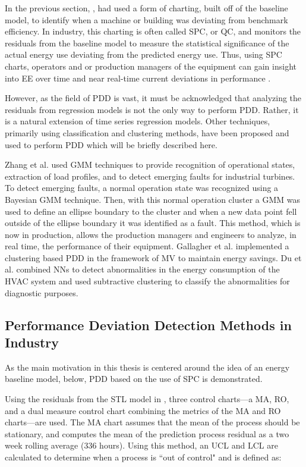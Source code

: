 In the previous section, \cite{tightening}\cite{cas}\cite{boiler}, had used a form of charting, built off of the baseline model, to identify when a machine or building was deviating from benchmark efficiency. In industry, this charting is often called SPC, or \ac{QC}, and monitors the residuals from the baseline model to measure the statistical significance of the actual energy use deviating from the predicted energy use. Thus, using SPC charts, operators and or production managers of the equipment can gain insight into EE over time and near real-time current deviations in performance \cite{oakland_statistical_2008}.

However, as the field of PDD is vast, it must be acknowledged that analyzing the residuals from regression models is not the only way to perform PDD. Rather, it is a natural extension of time series regression models. Other techniques, primarily using classification and clustering methods, have been proposed and used to perform PDD which will be briefly described here.

Zhang et al. \cite{gas-turbine-faults} used GMM techniques to provide recognition of operational states, extraction of load profiles, and to detect emerging faults for industrial turbines. To detect emerging faults, a normal operation state was recognized using a Bayesian GMM technique. Then, with this normal operation cluster a GMM was used to define an ellipse boundary to the cluster and when a new data point fell outside of the ellipse boundary it was identified as a fault. This method, which is now in production, allows the production managers and engineers to analyze, in real time, the performance of their equipment. Gallagher et al. \cite{intelliMAV} implemented a clustering based PDD in the framework of \ac{MV} to maintain energy savings. Du et al. \cite{fault-HVAC} combined NNs to detect abnormalities in the energy consumption of the HVAC system and used subtractive clustering to classify the abnormalities for diagnostic purposes.

\subsection{Performance Deviation Detection Methods in Industry}

As the main motivation in this thesis is centered around the idea of an energy baseline model, below, PDD based on the use of SPC is demonstrated.

Using the residuals from the STL model in \cite{tightening}, three control charts—a \ac{MA}, \ac{RO}, and a dual measure control chart combining the metrics of the MA and RO charts—are used. The MA chart assumes that the mean of the process should be stationary, and computes the mean of the prediction process residual as a two week rolling average ($336$ hours). Using this method, an \ac{UCL} and \ac{LCL} are calculated to determine when a process is ``out of control" and is defined as:

